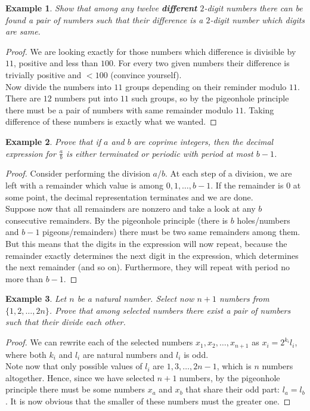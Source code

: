 \documentclass[12pt,a4paper]{article}
\newtheorem{theorem}{Example}
\begin{document}
\begin{theorem}
Show that among any twelve \textbf{different} $2$-digit numbers there can be found a pair of numbers such that their difference is a $2$-digit number which digits are same.
\end{theorem}
\begin{proof}
We are looking exactly for those numbers which difference is divisible by $11$, positive and less than $100$. For every two given numbers their difference is trivially positive and $<100$ (convince yourself).\\
Now divide the numbers into $11$ groups depending on their reminder modulo $11$. There are $12$ numbers put into $11$ such groups, so by the pigeonhole principle there must be a pair of numbers with same remainder modulo $11$. Taking difference of these numbers is exactly what we wanted.
\end{proof}

\begin{theorem}
Prove that if $a$ and $b$ are coprime integers, then the decimal expression for $\frac{a}{b}$ is either terminated or periodic with period at most $b - 1$. 
\end{theorem}
\begin{proof}
Consider performing the division $a/b$. At each step of a division, we are left with a remainder which value is among $0,1,\dots,b-1$. If the remainder is $0$ at some point, the decimal representation terminates and we are done. \\
Suppose now that all remainders are nonzero and take a look at any $b$ consecutive remainders. By the pigeonhole principle (there is $b$ holes/numbers and $b-1$ pigeons/remainders) there must be two same remainders among them. \\
But this means that the digits in the expression will now repeat, because the remainder exactly determines the next digit in the expression, which determines the next remainder (and so on). Furthermore, they will repeat with period no more than $b - 1$.
\end{proof}

\begin{theorem}
Let $n$ be a natural number. Select now $n + 1$ numbers from  $\{1,2,\dots,2n\}$. Prove that among selected numbers there exist a pair of numbers such that their divide each other.
\end{theorem}
\begin{proof}
We can rewrite each of the selected numbers $x_{1}, x_{2}, \dots,x_{n+1}$ as $x_{i} = 2^{k_{i}}l_{i}$, where both $k_{i}$ and $l_{i}$ are natural numbers and  $l_{i}$ is odd. \\
Note now that only possible values of $l_{i}$ are $1,3,\dots,2n - 1$, which is $n$ numbers altogether. Hence, since we have selected $n+1$ numbers, by the pigeonhole principle there must be some numbers $x_{a}$ and $x_{b}$ that share their odd part: $l_{a} = l_{b}$. It is now obvious that the smaller of these numbers must the greater one.
\end{proof}
\end{document}
